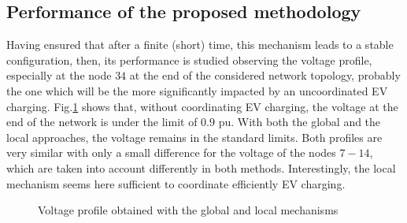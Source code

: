 \documentclass[journal]{IEEEtran}
\begin{document}
\subsection{Performance of the proposed methodology}


Having ensured that after a finite (short) time, this mechanism leads to a stable configuration, then, its performance is studied observing the voltage profile, especially at the node $34$ at the end of the considered network topology, probably the one which will be the more significantly impacted by an uncoordinated EV charging. Fig.\ref{fig:VProf} shows that, without coordinating EV charging, the voltage at the end of the network is under the limit of $0.9$ pu. With both the global and the local approaches, the voltage remains in the standard limits. Both profiles are very similar with only a small difference for the voltage of the nodes $7-14$, which are taken into account differently in both methods. Interestingly, the local mechanism seems here sufficient to coordinate efficiently EV charging. 



\begin{figure}[tbp]\vspace{-3mm}
\begin{center}\vspace{-2mm}
\vspace{-2mm}
\caption{Voltage profile obtained with the global and local mechanisms}
\label{fig:VProf} 
\end{center}\vspace{-5mm}
\end{figure}

\medskip
\end{document}
